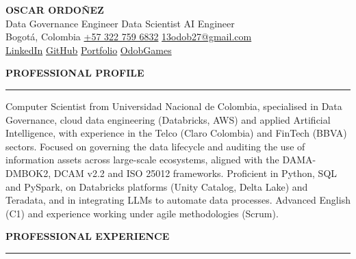 \documentclass[letterpaper,10pt]{article}
\newcommand{\sizeName}   {\fontsize{20}{23}\selectfont}
\newcommand{\sizeTitle}  {\fontsize{10.6}{12.7}\selectfont}
\newcommand{\sizeContact}{\fontsize{9}{11}\selectfont}
\newcommand{\sizeSection}{\fontsize{11.5}{13.8}\selectfont}
\newcommand{\sizeBody}   {\fontsize{10}{12.2}\selectfont}
\newcommand{\md}{\,\textperiodcentered\,}                  %
\newcommand{\sepdot}{\hspace{4pt}\textbullet\hspace{4pt}}   %
\newcommand{\cvsection}[1]{%
  \needspace{3\baselineskip}%
  \vspace{13pt}%
  {\color{cvblue}\sizeSection\bfseries #1}\par
  \vspace{-5pt}%
  {\color{cvblue}\rule{\textwidth}{0.7pt}}\par
  \vspace{3pt}%
}
\begin{document}
\sizeBody

{\centering
  {\color{cvdark}\sizeName\bfseries OSCAR ORDOÑEZ}\\[3pt]
  {\color{cvblue}\sizeTitle Data Governance Engineer\md Data Scientist\md AI Engineer}\\[1pt]
  {\color{cvgray}\sizeContact
    Bogotá, Colombia\sepdot
    \href{tel:+573227596832}{+57 322 759 6832}\sepdot
    \href{mailto:13odob27@gmail.com}{13odob27@gmail.com}}\\[0pt]
  {\color{cvgray}\sizeContact
    \href{https://www.linkedin.com/in/oscarordonez13}{LinkedIn}\sepdot
    \href{https://github.com/OdobGames}{GitHub}\sepdot
    \href{https://odobgames.github.io/Portafolio/}{Portfolio}\sepdot
    \href{https://odobgames.github.io/OdobGames}{OdobGames}}\par}
\vspace{0pt}

\cvsection{PROFESSIONAL PROFILE}

Computer Scientist from Universidad Nacional de Colombia, specialised in Data
Governance, cloud data engineering (Databricks, AWS) and applied Artificial
Intelligence, with experience in the Telco (Claro Colombia) and FinTech (BBVA)
sectors. Focused on governing the data lifecycle and auditing the use of
information assets across large-scale ecosystems, aligned with the DAMA-DMBOK2,
DCAM v2.2 and ISO 25012 frameworks. Proficient in Python, SQL and PySpark, on
Databricks platforms (Unity Catalog, Delta Lake) and Teradata, and in
integrating LLMs to automate data processes. Advanced English (C1) and
experience working under agile methodologies (Scrum).

\cvsection{PROFESSIONAL EXPERIENCE}
\end{document}
